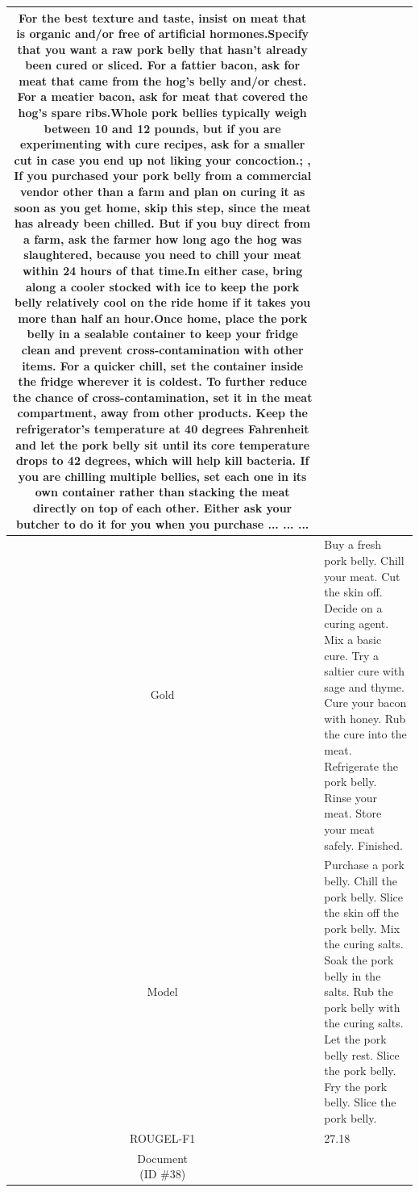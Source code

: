 \begin{table}[bth!]
\begin{tabular}{c|p{}}
For the best texture and taste, insist on meat that is organic and/or free of artificial hormones.Specify that you want a raw pork belly that hasn’t already been cured or sliced. For a fattier bacon, ask for meat that came from the hog’s belly and/or chest. For a meatier bacon, ask for meat that covered the hog’s spare ribs.Whole pork bellies typically weigh between 10 and 12 pounds, but if you are experimenting with cure recipes, ask for a smaller cut in case you end up not liking your concoction.; , If you purchased your pork belly from a commercial vendor other than a farm and plan on curing it as soon as you get home, skip this step, since the meat has already been chilled. But if you buy direct from a farm, ask the farmer how long ago the hog was slaughtered, because you need to chill your meat within 24 hours of that time.In either case, bring along a cooler stocked with ice to keep the pork belly relatively cool on the ride home if it takes you more than half an hour.Once home, place the pork belly in a sealable container to keep your fridge clean and prevent cross-contamination with other items. For a quicker chill, set the container inside the fridge wherever it is coldest. To further reduce the chance of cross-contamination, set it in the meat compartment, away from other products. Keep the refrigerator’s temperature at 40 degrees Fahrenheit and let the pork belly sit until its core temperature drops to 42 degrees, which will help kill bacteria. If you are chilling multiple bellies, set each one in its own container rather than stacking the meat directly on top of each other. Either ask your butcher to do it for you when you purchase ... ... ... 
\\ \hline
Gold & 
Buy a fresh pork belly. Chill your meat. Cut the skin off. Decide on a curing agent. Mix a basic cure. Try a saltier cure with sage and thyme. Cure your bacon with honey. Rub the cure into the meat. Refrigerate the pork belly. Rinse your meat. Store your meat safely. Finished.
\\ \hline
Model & 
Purchase a pork belly. Chill the pork belly. Slice the skin off the pork belly. Mix the curing salts. Soak the pork belly in the salts. Rub the pork belly with the curing salts. Let the pork belly rest. Slice the pork belly. Fry the pork belly. Slice the pork belly.
\\ \hline
ROUGEL-F1 & 
27.18
\\ \hline
\makecell{Document\\(ID \#38)} & 

\end{tabular}
\end{table}
